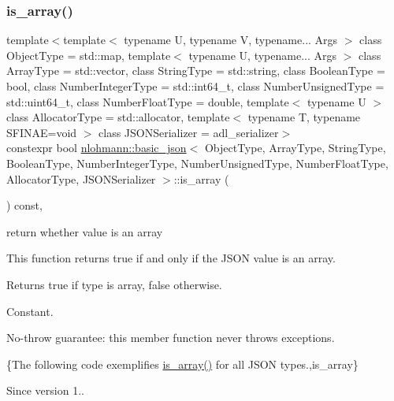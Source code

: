 \subsubsection{\texorpdfstring{is\+\_\+array()}{is\_array()}}
{\footnotesize\ttfamily template$<$template$<$ typename U, typename V, typename... Args $>$ class Object\+Type = std\+::map, template$<$ typename U, typename... Args $>$ class Array\+Type = std\+::vector, class String\+Type  = std\+::string, class Boolean\+Type  = bool, class Number\+Integer\+Type  = std\+::int64\+\_\+t, class Number\+Unsigned\+Type  = std\+::uint64\+\_\+t, class Number\+Float\+Type  = double, template$<$ typename U $>$ class Allocator\+Type = std\+::allocator, template$<$ typename T, typename S\+F\+I\+N\+A\+E=void $>$ class J\+S\+O\+N\+Serializer = adl\+\_\+serializer$>$ \\
constexpr bool \mbox{\hyperlink{classnlohmann_1_1basic__json}{nlohmann\+::basic\+\_\+json}}$<$ Object\+Type, Array\+Type, String\+Type, Boolean\+Type, Number\+Integer\+Type, Number\+Unsigned\+Type, Number\+Float\+Type, Allocator\+Type, J\+S\+O\+N\+Serializer $>$\+::is\+\_\+array (\begin{DoxyParamCaption}{ }\end{DoxyParamCaption}) const\hspace{0.3cm}{\ttfamily [inline]}, {\ttfamily [noexcept]}}



return whether value is an array 

This function returns true if and only if the J\+S\+ON value is an array.

\begin{DoxyReturn}{Returns}
{\ttfamily true} if type is array, {\ttfamily false} otherwise.
\end{DoxyReturn}
Constant.

No-\/throw guarantee\+: this member function never throws exceptions.

\{The following code exemplifies {\ttfamily \mbox{\hyperlink{classnlohmann_1_1basic__json_aef9ce5dd2381caee1f8ddcdb5bdd9c65}{is\+\_\+array()}}} for all J\+S\+ON types.,is\+\_\+array\}

\begin{DoxySince}{Since}
version 1.. 
\end{DoxySince}
\mbox{\label{classnlohmann_1_1basic__json_a943e8cb182d0f2365c76d64b42eaa6fd}} 
